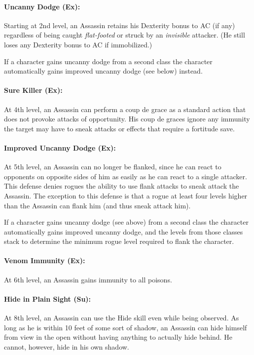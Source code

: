 \paragraph{Uncanny Dodge (Ex):}
Starting at 2nd level, an Assassin retains his Dexterity bonus to AC (if any) regardless of being caught \emph{flat-footed} or struck by an \emph{invisible} attacker. 
(He still loses any Dexterity bonus to AC if immobilized.)

If a character gains uncanny dodge from a second class the character automatically gains improved uncanny dodge (see below) instead.

\paragraph{Sure Killer (Ex):}
At 4th level, an Assassin can perform a coup de grace as a standard action that does not provoke attacks of opportunity.
His coup de graces ignore any immunity the target may have to sneak attacks or effects that require a fortitude save.
\paragraph{Improved Uncanny Dodge (Ex):}
At 5th level, an Assassin can no longer be flanked, 
since he can react to opponents on opposite sides of him as easily as he can react to a single attacker. 
This defense denies rogues the ability to use flank attacks to sneak attack the Assassin. 
The exception to this defense is that a rogue at least four levels higher than the Assassin can flank him (and thus sneak attack him).

If a character gains uncanny dodge (see above) from a second class the character automatically gains improved uncanny dodge, 
and the levels from those classes stack to determine the minimum rogue level required to flank the character.

\paragraph{Venom Immunity (Ex):}
At 6th level, an Assassin gains immunity to all poisons.

\paragraph{Hide in Plain Sight (Su):}
At 8th level, an Assassin can use the Hide skill even while being observed. 
As long as he is within 10 feet of some sort of shadow, an Assassin can hide himself from view in the open without having anything to actually hide behind. 
He cannot, however, hide in his own shadow.

